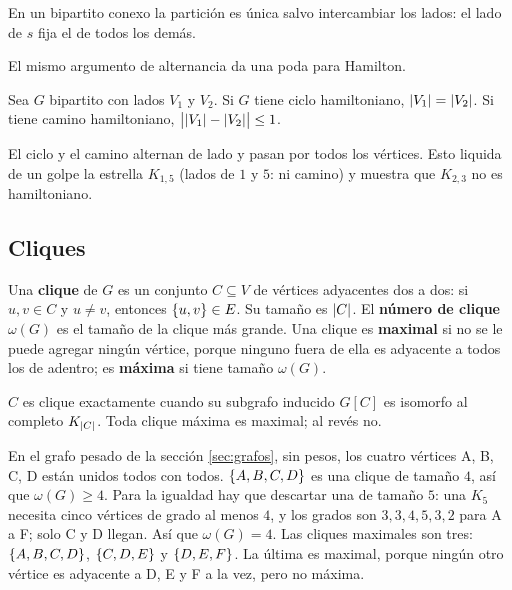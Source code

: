 \documentclass[11pt,letterpaper]{article}
\begin{document}
En un bipartito conexo la partición es única salvo intercambiar los
lados: el lado de $s$ fija el de todos los demás.

El mismo argumento de alternancia da una poda para Hamilton.

\begin{corolario}
  \label{cor:bipartito-hamilton}
  Sea $G$ bipartito con lados $V_1$ y $V_2$. Si $G$ tiene ciclo
  hamiltoniano, $\left\lvert V_1 \right\rvert = \left\lvert V_2 \right\rvert$. Si tiene camino
  hamiltoniano, $\bigl| \left\lvert V_1 \right\rvert - \left\lvert V_2 \right\rvert \bigr| \le 1$.
\end{corolario}

El ciclo y el camino alternan de lado y pasan por todos los
vértices. Esto liquida de un golpe la estrella $K_{1,5}$ (lados de $1$
y $5$: ni camino) y muestra que $K_{2,3}$ no es hamiltoniano.


\subsection*{Cliques}

\begin{definicion}[Clique]
  \label{def:clique}
  Una \textbf{clique} de $G$ es un conjunto $C \subseteq V$ de
  vértices adyacentes dos a dos: si $u, v \in C$ y $u \ne v$,
  entonces $\left\{ u, v \right\} \in E$. Su tamaño es $\left\lvert C \right\rvert$. El
  \textbf{número de clique} $\omega(G)$ es el tamaño de la clique más
  grande. Una clique es \textbf{maximal} si no se le puede agregar
  ningún vértice, porque ninguno fuera de ella es adyacente a todos
  los de adentro; es \textbf{máxima} si tiene tamaño $\omega(G)$.
\end{definicion}

$C$ es clique exactamente cuando su subgrafo inducido $G[C]$ es
isomorfo al completo $K_{\left\lvert C \right\rvert}$. Toda clique máxima es maximal; al
revés no.

\begin{ejemplo}
  \label{ej:clique-pesado}
  En el grafo pesado de la sección \ref{sec:grafos}, sin pesos, los
  cuatro vértices A, B, C, D están unidos todos con todos.
  $\left\{ A, B, C, D \right\}$ es una clique de tamaño $4$, así que
  $\omega(G) \ge 4$. Para la igualdad hay que descartar una de tamaño
  $5$: una $K_5$ necesita cinco vértices de grado al menos $4$, y los
  grados son $3, 3, 4, 5, 3, 2$ para A a F; solo C y D llegan. Así
  que $\omega(G) = 4$. Las cliques maximales son tres:
  $\left\{ A, B, C, D \right\}$, $\left\{ C, D, E \right\}$ y $\left\{ D, E, F \right\}$. La última es
  maximal, porque ningún otro vértice es adyacente a D, E y F a la
  vez, pero no máxima.
\end{ejemplo}
\end{document}
